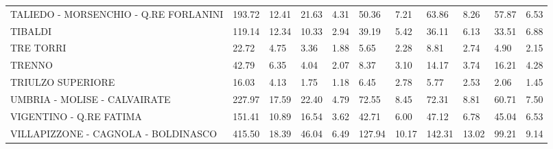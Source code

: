 \begin{table}[H]
{{\begin{tabular}{lp{1.3cm}p{1.3cm}p{1.3cm}p{1.3cm}p{1.3cm}p{1.3cm}p{1.3cm}p{1.3cm}p{1.3cm}p{1.3cm}}
TALIEDO - MORSENCHIO - Q.RE FORLANINI              &                    193.72 &                 12.41 &                       21.63 &                    4.31 &                       50.36 &                    7.21 &                       63.86 &                    8.26 &                     57.87 &                  6.53 \\
TIBALDI                                            &                    119.14 &                 12.34 &                       10.33 &                    2.94 &                       39.19 &                    5.42 &                       36.11 &                    6.13 &                     33.51 &                  6.88 \\
TRE TORRI                                          &                     22.72 &                  4.75 &                        3.36 &                    1.88 &                        5.65 &                    2.28 &                        8.81 &                    2.74 &                      4.90 &                  2.15 \\
TRENNO                                             &                     42.79 &                  6.35 &                        4.04 &                    2.07 &                        8.37 &                    3.10 &                       14.17 &                    3.74 &                     16.21 &                  4.28 \\
TRIULZO SUPERIORE                                  &                     16.03 &                  4.13 &                        1.75 &                    1.18 &                        6.45 &                    2.78 &                        5.77 &                    2.53 &                      2.06 &                  1.45 \\
UMBRIA - MOLISE - CALVAIRATE                       &                    227.97 &                 17.59 &                       22.40 &                    4.79 &                       72.55 &                    8.45 &                       72.31 &                    8.81 &                     60.71 &                  7.50 \\
VIGENTINO - Q.RE FATIMA                            &                    151.41 &                 10.89 &                       16.54 &                    3.62 &                       42.71 &                    6.00 &                       47.12 &                    6.78 &                     45.04 &                  6.53 \\
VILLAPIZZONE - CAGNOLA - BOLDINASCO                &                    415.50 &                 18.39 &                       46.04 &                    6.49 &                      127.94 &                   10.17 &                      142.31 &                   13.02 &                     99.21 &                  9.14 \\

\end{tabular}}}
\end{table}
